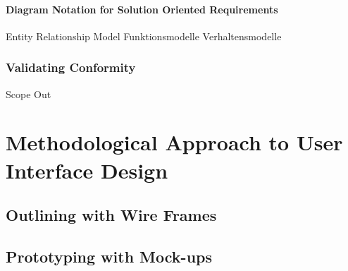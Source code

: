 \subsubsection{Diagram Notation for Solution Oriented Requirements}
Entity Relationship Model
Funktionsmodelle
Verhaltensmodelle
\clearpage
\subsection{Validating Conformity}
Scope Out
\clearpage
\chapter{Methodological Approach to User Interface Design}
\section{Outlining with Wire Frames}
\clearpage
\section{Prototyping with Mock-ups}
